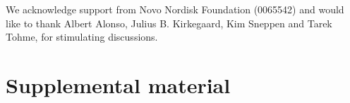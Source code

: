 \documentclass[%
 reprint,
superscriptaddress,
 amsmath,amssymb,
 prl,
]{revtex4-2}
\begin{document}
\bigskip

\begin{acknowledgments}
We acknowledge support from Novo Nordisk Foundation (0065542) and would like to thank Albert Alonso, Julius B. Kirkegaard,  Kim Sneppen and Tarek Tohme, for stimulating discussions.
\end{acknowledgments}

 
\clearpage
 \appendix
 
 \onecolumngrid
 \section*{Supplemental material}
\end{document}
